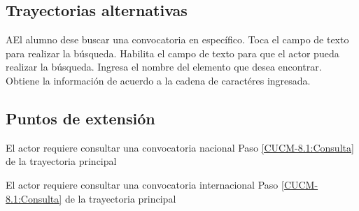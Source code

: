 	\subsection{Trayectorias alternativas}

\begin{UCtrayectoriaA}{A}{El alumno dese buscar una convocatoria en específico.}
	\UCpaso[\UCactor] Toca el campo de texto para realizar la búsqueda.
	\UCpaso[\UCsist] Habilita el campo de texto para que el actor pueda realizar la búsqueda.
	\UCpaso[\UCactor] Ingresa el nombre del elemento que desea encontrar.
	\UCpaso[\UCsist] Obtiene la información de acuerdo a la cadena de caractéres ingresada. 
\end{UCtrayectoriaA}

	\subsection{Puntos de extensión}
	
	\UCExtensionPoint
	{El actor requiere consultar una convocatoria nacional}
	{ Paso \ref{CUCM-8.1:Consulta} de la trayectoria principal}
	{}
	
	\UCExtensionPoint
	{El actor requiere consultar una convocatoria internacional}
	{ Paso \ref{CUCM-8.1:Consulta} de la trayectoria principal}
	{}
